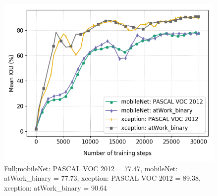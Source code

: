 \begin{figure}[htb!]
	\includegraphics[scale=0.4]{images/transfer_full}
	\caption{Full;mobileNet: PASCAL VOC 2012 = 77.47, mobileNet: atWork\_binary = 77.73, xception: PASCAL VOC 2012 = 89.38, xception: atWork\_binary = 90.64}
\end{figure}

